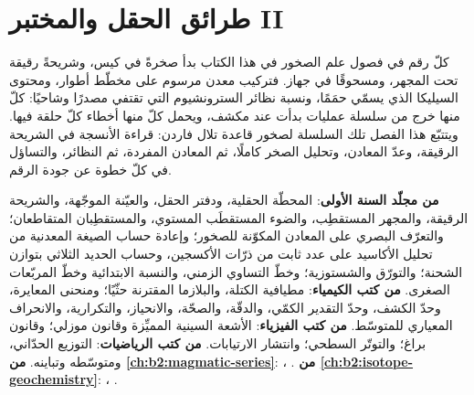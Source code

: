 \chapter{طرائق الحقل والمختبر II}\label{ch:b2:field-lab-methods-2}

كلّ رقم في فصول علم الصخور في هذا الكتاب بدأ صخرةً في كيس، وشريحةً رقيقة تحت
المجهر، ومسحوقًا في جهاز. فتركيب معدن مرسوم على مخطّط أطوار، ومحتوى
السيليكا الذي يسمّي حمَمًا، ونسبة نظائر السترونشيوم التي تقتفي مصدرًا وشاحيًا: كلّ منها
خرج من سلسلة عمليات بدأت عند مكشف، ويحمل كلّ منها أخطاء كلّ
حلقة فيها. ويتتبّع هذا الفصل تلك السلسلة لصخور قاعدة تلال فاردن: قراءة الأنسجة
في الشريحة الرقيقة، وعدّ المعادن، وتحليل الصخر كاملًا، ثم المعادن المفردة، ثم النظائر،
والتساؤل في كلّ خطوة عن جودة الرقم.

\begin{recall}
\textbf{من مجلّد السنة الأولى}: المحطّة الحقلية، ودفتر الحقل، والعيّنة الموجّهة، والشريحة الرقيقة،
والمجهر المستقطِب، والضوء المستقطَب المستوي، والمستقطِبان المتقاطعان؛ والتعرّف البصري على
المعادن المكوّنة للصخور؛ وإعادة حساب الصيغة المعدنية من تحليل الأكاسيد على عدد ثابت من ذرّات الأكسجين،
وحساب الحديد الثلاثي بتوازن الشحنة؛ والتورّق والشستوزية؛ وخطّ التساوي الزمني، والنسبة الابتدائية وخطّ
المربّعات الصغرى. \textbf{من كتب الكيمياء}: مطيافية الكتلة، والبلازما المقترنة حثّيًا؛
ومنحنى المعايرة، وحدّ الكشف، وحدّ التقدير الكمّي، والدقّة، والصحّة، والانحياز،
والتكرارية، والانحراف المعياري للمتوسّط. \textbf{من كتب الفيزياء}: الأشعة السينية المميِّزة
وقانون موزلي؛ وقانون براغ؛ والتوتّر السطحي؛ وانتشار الارتيابات.
\textbf{من كتب الرياضيات}: التوزيع الحدّاني، ومتوسّطه وتباينه.
\textbf{من \cref{ch:b2:magmatic-series}}: ، .
\textbf{من \cref{ch:b2:isotope-geochemistry}}: ، .
\end{recall}

